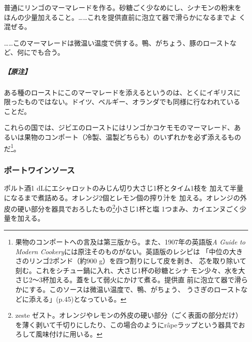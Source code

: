 \begin{recette}
普通にリンゴのマーマレードを作る。砂糖ごく少なめにし、シナモンの粉末を
ほんの少量加えること。\ldots{}\ldots{}これを提供直前に泡立て器で滑らかになるまでよ
く混ぜる。

\ldots{}\ldots{}このマーマレードは微温い温度で供する。鴨、がちょう、豚のローストなど、何にでも合う。

\hypertarget{nota-apple-sauce}{%
\subparagraph{【原注】}\label{nota-apple-sauce}}

ある種のローストにこのマーマレードを添えるというのは、とくにイギリスに
限ったものではない。ドイツ、ベルギー、オランダでも同様に行なわれている
ことだ。

これらの国では、ジビエのローストにはリンゴかコケモモのマーマレード、あ
るいは果物のコンポート（冷製、温製どちらも）のいずれかを必ず添えるもの
だ\footnote{果物のコンポートへの言及は第三版から。また、1907年の英語版\emph{A
  Guide to Modern Cookery}には原注そのものがない。英語版のレシピは
  「中位の大きさのリンゴ2ポンド（約900 g）を四つ割りにして皮を剥き、
  芯を取り除いて刻む。これをシチュー鍋に入れ、大さじ1杯の砂糖とシナ
  モン少々、水を大さじ2〜3杯加える。蓋をして弱火にかけて煮る。提供直
  前に泡立て器で滑らかにする。このソースは微温い温度で、鴨、がちょう、
  うさぎのローストなどに添える」(p.45)となっている。}。

\maeaki

\hypertarget{porto-wine-sauce}{%
\subsubsection{ポートワインソース}\label{porto-wine-sauce}}



ポルト酒1\undemi{} dLにエシャロットのみじん切り大さじ1杯とタイム1枝を
加えて半量になるまで煮詰める。オレンジ2個とレモン\undemi{}個の搾り汁を
加える。オレンジの外皮の硬い部分を器具でおろしたもの\footnote{zeste
  ゼスト。オレンジやレモンの外皮の硬い部分（ごく表面の部分だけ）を薄く剥いて千切りにしたり、この場合のようにrâpeラップという器具でおろして風味付けに用いる。}小さじ1杯と塩
1つまみ、カイエンヌごく少量を加える。


\end{recette}
